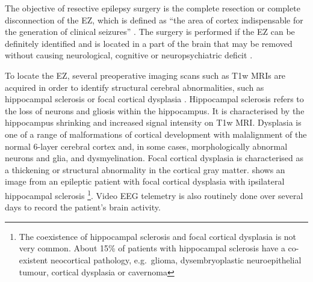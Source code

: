 The objective of resective epilepsy surgery is the complete resection or complete disconnection of the \ac{EZ}, which is defined as ``the area of cortex indispensable for the generation of clinical seizures'' \cite{rosenow_presurgical_2001}.
The surgery is performed if the \ac{EZ} can be definitely identified and is located in a part of the brain that may be removed without causing neurological, cognitive or neuropsychiatric deficit \cite{jobst_resective_2015}.

To locate the \ac{EZ}, several preoperative imaging scans such as \ac{T1w} \acp{MRI} are acquired in order to identify structural cerebral abnormalities, such as hippocampal sclerosis \cite{thom_review_2014} or focal cortical dysplasia \cite{kabat_focal_2012}.
Hippocampal sclerosis refers to the loss of neurons and gliosis within the hippocampus.
It is characterised by the hippocampus shrinking and increased signal intensity on \ac{T1w} \ac{MRI}.
Dysplasia is one of a range of malformations of cortical development with malalignment of the normal 6-layer cerebral cortex and, in some cases, morphologically abnormal neurons and glia, and dysmyelination.
Focal cortical dysplasia is characterised as a thickening or structural abnormality in the cortical gray matter.
shows an image from an epileptic patient with focal cortical dysplasia with ipsilateral hippocampal sclerosis%
\footnote{The coexistence of hippocampal sclerosis and focal cortical dysplasia is not very common.
About 15\% of patients with hippocampal sclerosis have a co-existent neocortical pathology, e.g.\ glioma, dysembryoplastic neuroepithelial tumour, cortical dysplasia or cavernoma}.
Video \ac{EEG} telemetry is also routinely done over several days to record the patient's brain activity.
